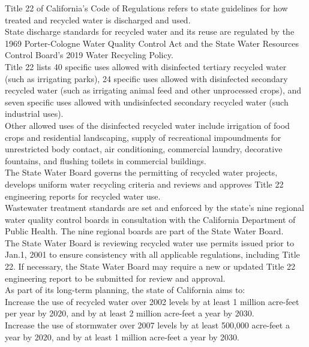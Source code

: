 \documentclass{article}
\begin{document}
Title 22 of California’s Code of Regulations refers to state guidelines for how treated and recycled water is discharged and used.\\

State discharge standards for recycled water and its reuse are regulated by the 1969 Porter-Cologne Water Quality Control Act and the State Water Resources Control Board’s 2019 Water Recycling Policy.\\

Title 22 lists 40 specific uses allowed with disinfected tertiary recycled water (such as irrigating parks), 24 specific uses allowed with disinfected secondary recycled water (such as irrigating animal feed and other unprocessed crops), and seven specific uses allowed with undisinfected secondary recycled water (such industrial uses).\\

Other allowed uses of the disinfected recycled water include irrigation of food crops and residential landscaping, supply of recreational impoundments for unrestricted body contact, air conditioning, commercial laundry, decorative fountains, and flushing toilets in commercial buildings.\\

The State Water Board governs the permitting of recycled water projects, develops uniform water recycling criteria and reviews and approves Title 22 engineering reports for recycled water use.\\

Wastewater treatment standards are set and enforced by the state’s nine regional water quality control boards in consultation with the California Department of Public Health. The nine regional boards are part of the State Water Board.\\

The State Water Board is reviewing recycled water use permits issued prior to Jan.1, 2001 to ensure consistency with all applicable regulations, including Title 22. If necessary, the State Water Board may require a new or updated Title 22 engineering report to be submitted for review and approval.\\

As part of its long-term planning, the state of California aims to:\\

Increase the use of recycled water over 2002 levels by at least 1 million acre-feet per year by 2020, and by at least 2 million acre-feet a year by 2030.\\
Increase the use of stormwater over 2007 levels by at least 500,000 acre-feet a year by 2020, and by at least 1 million acre-feet a year by 2030.\\
\end{document}
